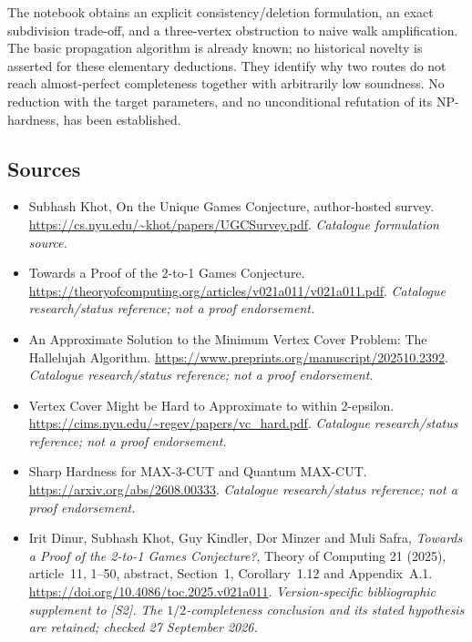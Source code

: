 \documentclass[11pt,a4paper]{article}
\numberwithin{equation}{section}
\begin{document}
The notebook obtains an explicit consistency/deletion formulation, an
exact subdivision trade-off, and a three-vertex obstruction to naive walk
amplification. The basic propagation algorithm is already known; no
historical novelty is asserted for these elementary deductions. They
identify why two routes do not reach almost-perfect completeness together
with arbitrarily low soundness. No reduction with the target parameters,
and no unconditional refutation of its NP-hardness, has been established.


\subsection{Sources}
\begin{itemize}\raggedright
\item[\textnormal{[S1]}]\hypertarget{source:statement:1}{} Subhash Khot, On the Unique Games Conjecture, author-hosted survey.
\url{https://cs.nyu.edu/~khot/papers/UGCSurvey.pdf}.
{\small\textit{Catalogue formulation source.}}
\item[\textnormal{[S2]}]\hypertarget{source:statement:2}{} Towards a Proof of the 2-to-1 Games Conjecture.
\url{https://theoryofcomputing.org/articles/v021a011/v021a011.pdf}.
{\small\textit{Catalogue research/status reference; not a proof endorsement.}}
\item[\textnormal{[S3]}]\hypertarget{source:statement:3}{} An Approximate Solution to the Minimum Vertex Cover Problem: The Hallelujah Algorithm.
\url{https://www.preprints.org/manuscript/202510.2392}.
{\small\textit{Catalogue research/status reference; not a proof endorsement.}}
\item[\textnormal{[S4]}]\hypertarget{source:statement:4}{} Vertex Cover Might be Hard to Approximate to within 2-epsilon.
\url{https://cims.nyu.edu/~regev/papers/vc_hard.pdf}.
{\small\textit{Catalogue research/status reference; not a proof endorsement.}}
\item[\textnormal{[S5]}]\hypertarget{source:statement:5}{} Sharp Hardness for MAX-3-CUT and Quantum MAX-CUT.
\url{https://arxiv.org/abs/2608.00333}.
{\small\textit{Catalogue research/status reference; not a proof endorsement.}}
\item[\textnormal{[E1]}]\hypertarget{extra:statement:1}{} Irit Dinur, Subhash Khot,
Guy Kindler, Dor Minzer and Muli Safra, \emph{Towards a Proof of the
2-to-1 Games Conjecture?}, Theory of Computing 21 (2025), article~11,
1--50, abstract, Section~1, Corollary~1.12 and Appendix~A.1.
\url{https://doi.org/10.4086/toc.2025.v021a011}.
{\small\textit{Version-specific bibliographic supplement to [S2]. The
$1/2$-completeness conclusion and its stated hypothesis are retained;
checked 27 September 2026.}}

\end{itemize}

\end{document}

